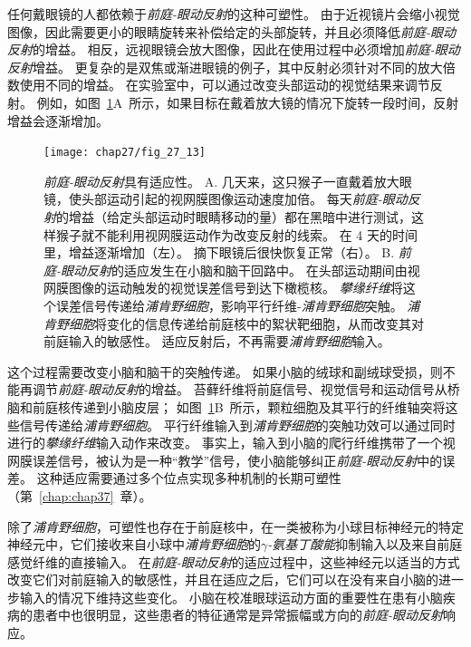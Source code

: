 任何戴眼镜的人都依赖于\textit{前庭-眼动反射}的这种可塑性。
由于近视镜片会缩小视觉图像，因此需要更小的眼睛旋转来补偿给定的头部旋转，并且必须降低\textit{前庭-眼动反射}的增益。
相反，远视眼镜会放大图像，因此在使用过程中必须增加\textit{前庭-眼动反射}增益。
更复杂的是双焦或渐进眼镜的例子，其中反射必须针对不同的放大倍数使用不同的增益。
在实验室中，可以通过改变头部运动的视觉结果来调节反射。 
例如，如图~\ref{fig:27_13}A~所示，如果目标在戴着放大镜的情况下旋转一段时间，反射增益会逐渐增加。


\begin{figure}[htbp]
	\centering
	\texttt{[image: chap27/fig\_27\_13]}
	\caption{\textit{前庭-眼动反射}具有适应性。
		A. 几天来，这只猴子一直戴着放大眼镜，使头部运动引起的视网膜图像运动速度加倍。
		每天\textit{前庭-眼动反射}的增益（给定头部运动时眼睛移动的量）都在黑暗中进行测试，这样猴子就不能利用视网膜运动作为改变反射的线索。
		在 4 天的时间里，增益逐渐增加（左）。
		摘下眼镜后很快恢复正常（右）\cite{miles1980long}。
		B. \textit{前庭-眼动反射}的适应发生在小脑和脑干回路中。
		在头部运动期间由视网膜图像的运动触发的视觉误差信号到达下橄榄核。
		\textit{攀缘纤维}将这个误差信号传递给\textit{浦肯野细胞}，影响平行纤维-\textit{浦肯野细胞}突触。
		\textit{浦肯野细胞}将变化的信息传递给前庭核中的絮状靶细胞，从而改变其对前庭输入的敏感性。
		适应反射后，不再需要\textit{浦肯野细胞}输入。}
	\label{fig:27_13}
\end{figure}


这个过程需要改变小脑和脑干的突触传递。
如果小脑的绒球和副绒球受损，则不能再调节\textit{前庭-眼动反射}的增益。
苔藓纤维将前庭信号、视觉信号和运动信号从桥脑和前庭核传递到小脑皮层；
如图~\ref{fig:27_13}B~所示，颗粒细胞及其平行的纤维轴突将这些信号传递给\textit{浦肯野细胞}。
平行纤维输入到\textit{浦肯野细胞}的突触功效可以通过同时进行的\textit{攀缘纤维}输入动作来改变。
事实上，输入到小脑的爬行纤维携带了一个视网膜误差信号，被认为是一种“教学”信号，使小脑能够纠正\textit{前庭-眼动反射}中的误差。
这种适应需要通过多个位点实现多种机制的长期可塑性（第~\ref{chap:chap37}~章）。


除了\textit{浦肯野细胞}，可塑性也存在于前庭核中，在一类被称为小球目标神经元的特定神经元中，它们接收来自小球中\textit{浦肯野细胞}的\textit{$\gamma$-氨基丁酸能}抑制输入以及来自前庭感觉纤维的直接输入。
在\textit{前庭-眼动反射}的适应过程中，这些神经元以适当的方式改变它们对前庭输入的敏感性，并且在适应之后，它们可以在没有来自小脑的进一步输入的情况下维持这些变化。
小脑在校准眼球运动方面的重要性在患有小脑疾病的患者中也很明显，这些患者的特征通常是异常振幅或方向的\textit{前庭-眼动反射}响应。



